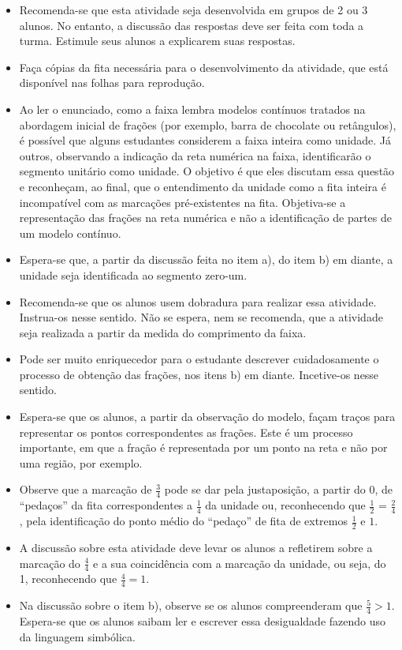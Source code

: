 \begin{multicols}{2}
      
\begin{itemize} %
    \item       Recomenda-se que esta atividade seja desenvolvida em grupos de 2 ou 3 alunos. No entanto, a discussão das respostas deve ser feita com toda a turma. Estimule seus alunos a explicarem suas respostas.
    \item       Faça cópias da fita necessária para o desenvolvimento da atividade, que está disponível nas folhas para reprodução.
    \item       Ao ler o enunciado, como a faixa lembra modelos contínuos tratados na abordagem inicial de frações (por exemplo, barra de chocolate ou retângulos), é possível que alguns estudantes considerem a faixa inteira como unidade. Já outros, observando a indicação da reta numérica na faixa, identificarão o segmento unitário como unidade. O objetivo é que eles discutam essa questão e reconheçam, ao final, que o entendimento da unidade como a fita inteira é incompatível com as marcações pré-existentes na fita. Objetiva-se a representação das frações na reta numérica e não a identificação de partes de um modelo contínuo. 
    \item       Espera-se que, a partir da discussão feita no item a), do item b) em diante, a unidade seja identificada ao segmento zero-um.
    \item       Recomenda-se que os alunos usem dobradura para realizar essa atividade. Instrua-os nesse sentido. Não se espera, nem se recomenda, que a atividade seja realizada a partir da medida do comprimento da faixa.
    \item       Pode ser muito enriquecedor para o estudante descrever cuidadosamente o processo de obtenção das frações, nos itens b) em diante. Incetive-os nesse sentido.
    \item       Espera-se que os alunos, a partir da observação do modelo, façam traços para representar os pontos correspondentes as frações. Este é um processo importante, em que a fração é representada por um ponto na reta e não por uma região, por exemplo. 
    \item       Observe que a marcação de       $\frac{3}{4}$       pode se dar pela justaposição, a partir do       $0$, de       ``pedaços''       da fita correspondentes a       $\frac{1}{4}$       da unidade ou, reconhecendo que       $\frac{1}{2}$       =       $\frac{2}{4}$, pela identificação do ponto médio do       ``pedaço''       de fita de extremos       $\frac{1}{2}$       e       $1$.    
    \item       A discussão sobre esta atividade deve levar os alunos a refletirem sobre a marcação do       $\frac{4}{4}$       e a sua coincidência com a marcação da unidade, ou seja, do 1, reconhecendo que       $\frac{4}{4}=1$. 
    \item       Na discussão sobre o item b), observe se os alunos compreenderam que       $\frac{5}{4}>1$. Espera-se que os alunos saibam ler e escrever essa desigualdade fazendo uso da linguagem simbólica.  
\end{itemize} %
  


\end{multicols}
